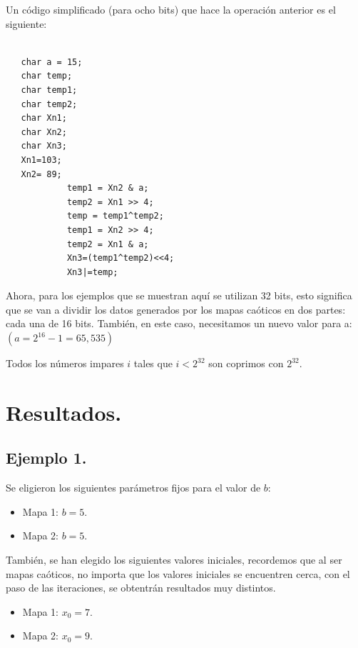 \documentclass[10pt]{IEEEtran}
\begin{document}
Un código simplificado (para ocho bits) que hace la operación anterior es el siguiente:
\begin{verbatim}

   char a = 15;
   char temp;
   char temp1;
   char temp2;
   char Xn1;
   char Xn2;
   char Xn3;
   Xn1=103;
   Xn2= 89;
            temp1 = Xn2 & a;
            temp2 = Xn1 >> 4;
            temp = temp1^temp2;
            temp1 = Xn2 >> 4;
            temp2 = Xn1 & a;
            Xn3=(temp1^temp2)<<4;
            Xn3|=temp;
\end{verbatim}


Ahora, para los ejemplos que se muestran aquí se utilizan 32 bits, esto significa que se van a dividir los datos generados por los mapas caóticos en dos partes: cada una de 16 bits. También, en este caso, necesitamos un nuevo valor para a: $(a = 2^{16}-1= 65,535)$



Todos los números impares $i$ tales que $i < 2^{32}$ son coprimos con $ 2^{32}$.
 
\section{Resultados.}

\subsection{Ejemplo 1.}
Se eligieron los siguientes parámetros fijos para el valor de $b$:

\begin{itemize}
\item Mapa 1: $b =  5$.
\item Mapa 2: $b =  5$.
\end{itemize}

También, se han elegido los siguientes valores iniciales, recordemos que al ser mapas caóticos, no importa que los valores iniciales se encuentren cerca, con el paso de las iteraciones, se obtentrán resultados muy distintos.

\begin{itemize}
\item Mapa 1: $x_{0} = 7$.
\item Mapa 2: $x_{0} = 9$.
\end{itemize}
\end{document}
